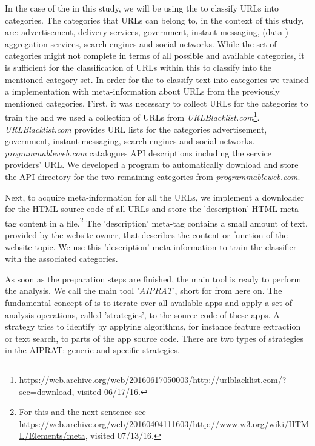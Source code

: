 In the case of the \sca in this study, we will be using the \nbc to classify URLs into categories.
The categories that URLs can belong to, in the context of this study, are: advertisement, delivery services, government, instant-messaging, (data-) aggregation services, search engines and social networks.
While the set of categories might not complete in terms of all possible and available categories, it is sufficient for the classification of URLs within this \sca to classify into the mentioned category-set.
In order for the \nbc to classify text into categories we trained a \nbc implementation with meta-information about URLs from the previously mentioned categories.
First, it was necessary to collect URLs for the categories to train the \nbc and we used a collection of \acs{URL}s from \textit{URLBlacklist.com}\footnote{\url{https://web.archive.org/web/20160617050003/http://urlblacklist.com/?sec=download}, visited 06/17/16.}.
\textit{URLBlacklist.com} provides URL lists for the categories advertisement, government, instant-messaging, search engines and social networks.
\textit{programmableweb.com} catalogues API descriptions including the service providers' URL.
We developed a program to automatically download and store the API directory for the two remaining categories from \textit{programmableweb.com}.

Next, to acquire meta-information for all the URLs, we implement a downloader for the HTML source-code of all URLs and store the 'description' HTML-meta tag content in a file.\footnote{For this and the next sentence see \url{https://web.archive.org/web/20160404111603/http://www.w3.org/wiki/HTML/Elements/meta}, visited 07/13/16.}
The 'description' meta-tag contains a small amount of text, provided by the website owner, that describes the content or function of the website topic.
We use this 'description' meta-information to train the classifier with the associated categories.\newline

As soon as the preparation steps are finished, the main \sca tool is ready to perform the \ipr analysis.
We call the main \sca tool '\textit{AIPRAT}', short for \aiprat from here on.
The fundamental concept of \AIPRAT is to iterate over all available apps and apply a set of analysis operations, called 'strategies', to the source code of these apps.
A strategy tries to identify \iprfs by applying algorithms, for instance feature extraction or text search, to parts of the app source code.
There are two types of strategies in the AIPRAT: generic and specific strategies.

